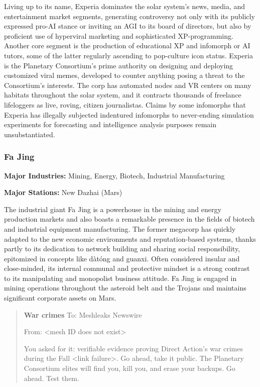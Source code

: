 Living up to its name, Experia dominates the solar system's news, media, and entertainment market segments, generating controversy not only with its publicly expressed pro-AI stance or inviting an AGI to its board of directors, but also by proficient use of hyperviral marketing and sophisticated XP-programming. Another core segment is the production of educational XP and infomorph or AI tutors, some of the latter regularly ascending to pop-culture icon status. Experia is the Planetary Consortium's prime authority on designing and deploying customized viral memes, developed to counter anything posing a threat to the Consortium's interests. The corp has automated nodes and VR centers on many habitats throughout the solar system, and it contracts thousands of freelance lifeloggers as live, roving, citizen journalistas. Claims by some infomorphs that Experia has illegally subjected indentured infomorphs to never-ending simulation experiments for forecasting and intelligence analysis purposes remain unsubstantiated. 

\subsubsection{Fa Jing} \label{sec:fa-jing} 

\textbf{Major Industries:} Mining, Energy, Biotech, Industrial Manufacturing 

\textbf{Major Stations:} New Dazhai (Mars) 

The industrial giant Fa Jing is a powerhouse in the mining and energy production markets and also boasts a remarkable presence in the fields of biotech and industrial equipment manufacturing. The former megacorp has quickly adapted to the new economic environments and reputation-based systems, thanks partly to its dedication to network building and sharing social responsibility, epitomized in concepts like dàtóng and guanxi. Often considered insular and close-minded, its internal communal and protective mindset is a strong contrast to its manipulating and monopolist business attitude. Fa Jing is engaged in mining operations throughout the asteroid belt and the Trojans and maintains significant corporate assets on Mars. 

\begin{quotation} \textbf{War crimes} To: Meshleaks Newswire 

From: <mesh ID does not exist> 

You asked for it: verifiable evidence proving Direct Action's war crimes during the Fall <link failure>. Go ahead, take it public. The Planetary Consortium elites will find you, kill you, and erase your backups. Go ahead. Test them. \end{quotation} 

